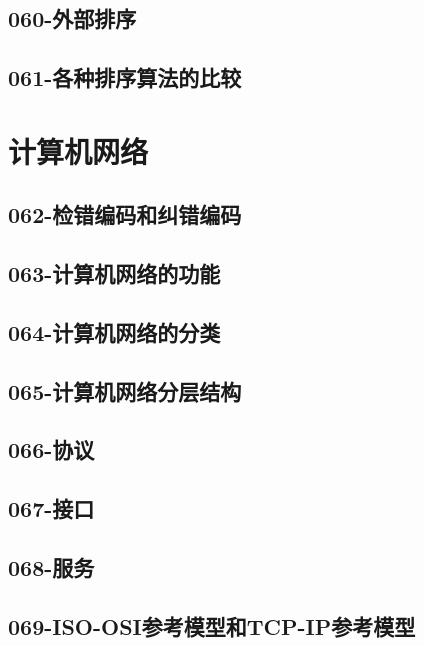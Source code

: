 \subsection{060-外部排序}

\subsection{061-各种排序算法的比较}

\section{计算机网络}


\subsection{062-检错编码和纠错编码}

\subsection{063-计算机网络的功能}

\subsection{064-计算机网络的分类}

\subsection{065-计算机网络分层结构}

\subsection{066-协议}

\subsection{067-接口}

\subsection{068-服务}

\subsection{069-ISO-OSI参考模型和TCP-IP参考模型}

